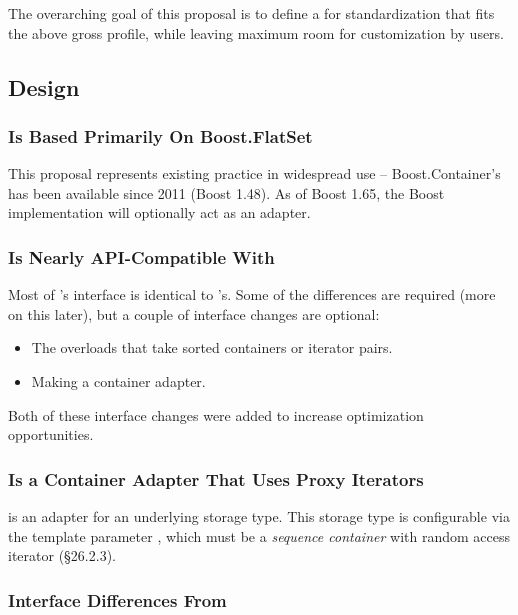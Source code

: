The overarching goal of this proposal is to define a  for
standardization that fits the above gross profile, while leaving maximum room
for customization by users.

\subsection{Design}

\subsubsection{ Is Based Primarily On Boost.FlatSet}

This proposal represents existing practice in widespread use --
Boost.Container's  has been available since 2011 (Boost 1.48).
As of Boost 1.65, the Boost implementation will optionally act as an adapter.

\subsubsection{ Is Nearly API-Compatible With }

Most of 's interface is identical to 's.  Some of the
differences are required (more on this later), but a couple of interface
changes are optional:

\begin{itemize}
  \item The overloads that take sorted containers or iterator pairs.

  \item Making  a container adapter.
\end{itemize}

Both of these interface changes were added to increase optimization
opportunities.

\subsubsection{ Is a Container Adapter That Uses Proxy Iterators}

 is an adapter for an underlying storage type.  This storage
type is configurable via the template parameter , which must
be a \textit{sequence container} with random access iterator (\S26.2.3).\\

\subsubsection{Interface Differences From }

